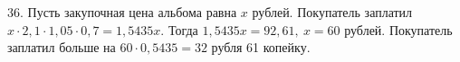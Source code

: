 36. Пусть закупочная цена альбома равна $x$ рублей. Покупатель заплатил $x\cdot2,1\cdot1,05\cdot0,7=1,5435x.$ Тогда $1,5435x=92,61,\ x=60$ рублей. Покупатель заплатил больше на $60\cdot0,5435=32$ рубля 61 копейку.\\
